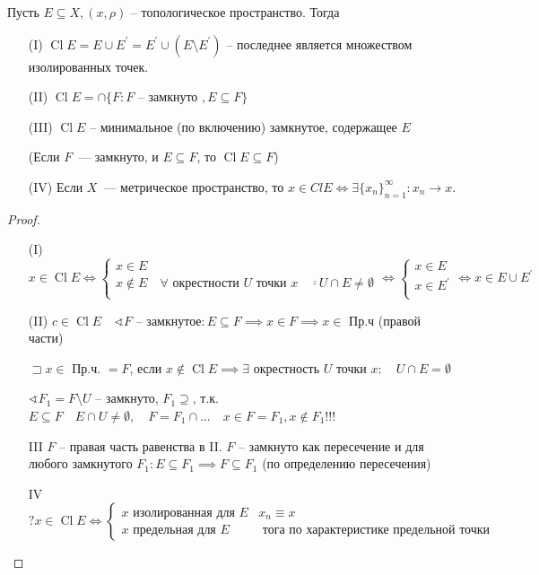 \documentclass{book}
\renewcommand\O{\ensuremath{\emptyset}}
\newcommand{\p}[1]{#1^{\prime}}
\DeclareMathOperator{\Cl}{Cl}
\theoremstyle{definition}
\begin{document}
    \begin{theorem}
        [О замыкании]
    
        Пусть $E \subseteq X, (x, \rho)$ -- топологическое пространство. 
        Тогда
        \begin{enumerate}
            \item [(I)] $\Cl E = E\cup \p E = \p E \cup (E\setminus \p E)$ -- последнее является множеством изолированных точек. 
            \item [(II)]  $\Cl E = \cap \{F: F \text{ -- замкнуто }, E\subseteq F\} $
            \item [(III)] $\Cl E$ -- минимальное (по включению) замкнутое, содержащее  $E$
    
            (Если $F$~--- замкнуто, и $E\subseteq F$, то $\Cl E\subseteq F$) 
            \item [(IV)] Если $X$~--- метрическое пространство, то  $x\in Cl E \iff \exists \{x_{n} \}_{n=1}^{\infty }: x_{n} \to x$.
        \end{enumerate}
    \end{theorem}
    \begin{proof}
        \begin{enumerate}
            \item [(I)] \( x\in \Cl E \iff 
            \begin{cases}
                x\in E\\
                x\not\in E \quad \forall \text{ окрестности } U \text{ точки } x\quad \overline{\cdot}U\cap E \neq \O\\ 
            \end{cases} \iff  
            \begin{cases}
                x\in E\\
                x\in \p E\\
            \end{cases} \iff  x\in E\cup \p E \)
        \item [(II)] $c\in \Cl E\quad \sphericalangle F$ -- замкнутое$: E\subseteq F \implies  x\in F \implies x\in$ Пр.ч (правой части)
    
            $\sqsupset x\in$ Пр.ч. $=F$, если  $x\not\in \Cl E \implies  \exists $ окрестность $U$ точки $x:\quad U\cap E = \O $ 
    
             $\sphericalangle F_1 = F\setminus U$ -- замкнуто, $ F_1\supseteq$, т.к. $ E\subseteq F\quad E\cap U\neq \O , \quad F = F_1 \cap \ldots\quad x\in F = F_1, x\not\in F_1$!!!
         \item [III] $F$ -- правая часть равенства в II.  
         $F$ -- замкнуто как пересечение и для любого замкнутого $F_1: E\subseteq F_1 \implies F\subseteq F_1$ (по определению пересечения)
         \item [IV] $?x\in \Cl E \iff  
         \begin{cases}
                 x \text{ изолированная для } E &x_{n} \equiv x\\
                 x \text{ предельная для } E & \text{ тога по характеристике предельной точки}
         \end{cases}$
        \end{enumerate}
    \end{proof}
    
\end{document}
